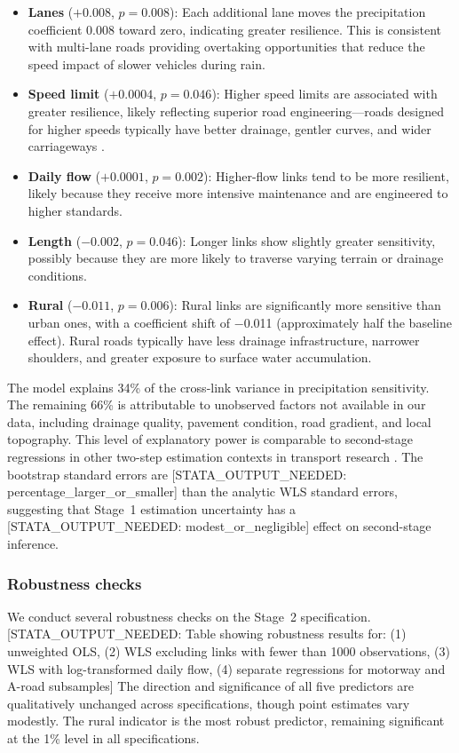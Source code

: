 \documentclass[review]{elsarticle}
\begin{document}
\begin{itemize}
    \item \textbf{Lanes} ($+0.008$, $p = 0.008$): Each additional lane moves the precipitation coefficient 0.008 toward zero, indicating greater resilience. This is consistent with multi-lane roads providing overtaking opportunities that reduce the speed impact of slower vehicles during rain.
    \item \textbf{Speed limit} ($+0.0004$, $p = 0.046$): Higher speed limits are associated with greater resilience, likely reflecting superior road engineering---roads designed for higher speeds typically have better drainage, gentler curves, and wider carriageways \citep{raccagni2024urban}.
    \item \textbf{Daily flow} ($+0.0001$, $p = 0.002$): Higher-flow links tend to be more resilient, likely because they receive more intensive maintenance and are engineered to higher standards.
    \item \textbf{Length} ($-0.002$, $p = 0.046$): Longer links show slightly greater sensitivity, possibly because they are more likely to traverse varying terrain or drainage conditions.
    \item \textbf{Rural} ($-0.011$, $p = 0.006$): Rural links are significantly more sensitive than urban ones, with a coefficient shift of $-$0.011 (approximately half the baseline effect). Rural roads typically have less drainage infrastructure, narrower shoulders, and greater exposure to surface water accumulation.
\end{itemize}

The model explains 34\% of the cross-link variance in precipitation sensitivity. The remaining 66\% is attributable to unobserved factors not available in our data, including drainage quality, pavement condition, road gradient, and local topography. This level of explanatory power is comparable to second-stage regressions in other two-step estimation contexts in transport research \citep{pulugurtha2021aadt}. The bootstrap standard errors are [STATA\_OUTPUT\_NEEDED: percentage\_larger\_or\_smaller] than the analytic WLS standard errors, suggesting that Stage~1 estimation uncertainty has a [STATA\_OUTPUT\_NEEDED: modest\_or\_negligible] effect on second-stage inference.

\subsubsection{Robustness checks}

We conduct several robustness checks on the Stage~2 specification. [STATA\_OUTPUT\_NEEDED: Table showing robustness results for: (1) unweighted OLS, (2) WLS excluding links with fewer than 1000 observations, (3) WLS with log-transformed daily flow, (4) separate regressions for motorway and A-road subsamples] The direction and significance of all five predictors are qualitatively unchanged across specifications, though point estimates vary modestly. The rural indicator is the most robust predictor, remaining significant at the 1\% level in all specifications.
\end{document}
